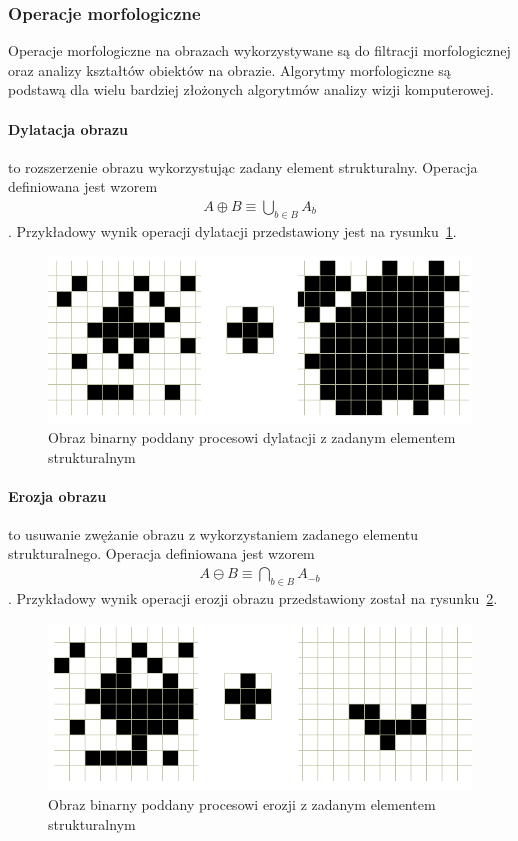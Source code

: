 \subsubsection{Operacje morfologiczne}
Operacje morfologiczne na obrazach wykorzystywane są do filtracji morfologicznej oraz analizy kształtów obiektów na obrazie. Algorytmy morfologiczne są podstawą dla wielu bardziej złożonych algorytmów analizy wizji komputerowej.
\paragraph {Dylatacja obrazu} to rozszerzenie obrazu wykorzystując zadany element strukturalny. Operacja definiowana jest wzorem
\begin{gather*}
  A \oplus B \equiv \bigcup \limits_{b \in B} A_b
\end{gather*}.
Przykładowy wynik operacji dylatacji przedstawiony jest na rysunku~\ref{fig:dilate}.
\begin{figure}
  \centering
  \includegraphics[width=15cm]{img/dilate}
  \caption{Obraz binarny poddany procesowi dylatacji z zadanym elementem strukturalnym}
  \label{fig:dilate}
\end{figure}
\paragraph {Erozja obrazu} to usuwanie zwężanie obrazu z wykorzystaniem zadanego elementu strukturalnego. Operacja definiowana jest wzorem
\begin{gather*}
  A \ominus B \equiv \bigcap \limits_{b \in B} A_{-b}
\end{gather*}.
Przykładowy wynik operacji erozji obrazu przedstawiony został na rysunku~\ref{fig:erode}.
\begin{figure}
  \centering
  \includegraphics[width=15cm]{img/erode}
  \caption{Obraz binarny poddany procesowi erozji z zadanym elementem strukturalnym}
  \label{fig:erode}
\end{figure}
